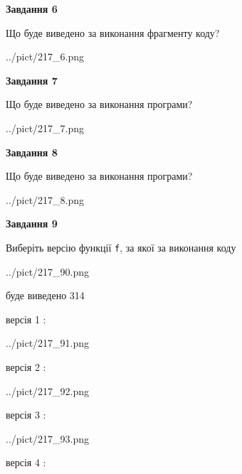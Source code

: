 \documentclass[12pt, ukrainian]{article}
\def\code#1{\Verb!#1!}
\begin{document}
{\begin {large}
{\begin {center}\textbf{Завдання 6}\end {center}}

Що буде виведено за виконання фрагменту коду?\par
\begin{center}
	{../pict/217_6.png}
\end{center}
\newpage

{\begin {center}\textbf{Завдання 7}\end {center}}

Що буде виведено за виконання програми?\par
\begin{center}
	{../pict/217_7.png}
\end{center}
\newpage

{\begin {center}\textbf{Завдання 8}\end {center}}

Що буде виведено за виконання програми?\par
\begin{center}
	{../pict/217_8.png}
\end{center}
\newpage

{\begin {center}\textbf{Завдання 9}\end {center}}

Виберіть версію функції \code{f}, за якої за виконання коду
\begin{center}
	{../pict/217_90.png}
\end{center}
буде виведено 314

\vspace{5mm}
версія 1 :

\begin{center}
	{../pict/217_91.png}
\end{center}
версія 2 :

\begin{center}
	{../pict/217_92.png}
\end{center}
версія 3 :

\begin{center}
	{../pict/217_93.png}
\end{center}
версія 4 :


\end{large}}
\end{document}
